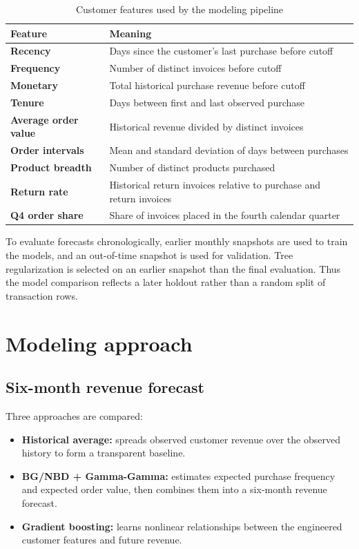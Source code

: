 \documentclass[11pt,a4paper]{article}
\begin{document}
\begin{table}[H]
\centering
\caption{Customer features used by the modeling pipeline}
\label{tab:features}
\begin{tabularx}{\textwidth}{@{}>{\bfseries}l Y@{}}
\toprule
Feature & Meaning\\
\midrule
Recency & Days since the customer's last purchase before cutoff\\
Frequency & Number of distinct invoices before cutoff\\
Monetary & Total historical purchase revenue before cutoff\\
Tenure & Days between first and last observed purchase\\
Average order value & Historical revenue divided by distinct invoices\\
Order intervals & Mean and standard deviation of days between purchases\\
Product breadth & Number of distinct products purchased\\
Return rate & Historical return invoices relative to purchase and return invoices\\
Q4 order share & Share of invoices placed in the fourth calendar quarter\\
\bottomrule
\end{tabularx}
\end{table}

To evaluate forecasts chronologically, earlier monthly snapshots are used to
train the models, and an out-of-time snapshot is used for validation. Tree
regularization is selected on an earlier snapshot than the final evaluation.
Thus the model comparison reflects a later holdout rather than a random split
of transaction rows.

\section{Modeling approach}

\subsection{Six-month revenue forecast}
Three approaches are compared:
\begin{itemize}
  \item \textbf{Historical average:} spreads observed customer revenue over the
  observed history to form a transparent baseline.
  \item \textbf{BG/NBD + Gamma-Gamma:} estimates expected purchase frequency and
  expected order value, then combines them into a six-month revenue forecast.
  \item \textbf{Gradient boosting:} learns nonlinear relationships between the
  engineered customer features and future revenue.
\end{itemize}
\end{document}
